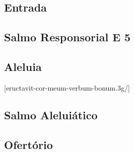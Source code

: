 
\subsection{Entrada}\label{subsection:proprium-sanctorum/in-assumptione-bmv/introitus}

\AllowPageFlush

\subsection[Salmo Responsorial]{Salmo Responsorial \textmd{E 5}}\label{subsection:proprium-sanctorum/in-assumptione-bmv/psalmus-responsorius}

\AllowPageFlush

\subsection{Aleluia}\label{subsection:proprium-sanctorum/in-assumptione-bmv/alleluia}
[eructavit-cor-meum-verbum-bonum.3g/]

\AllowPageFlush

\subsection{Salmo Aleluiático}\label{subsection:proprium-sanctorum/in-assumptione-bmv/psalmus-alleluiaticus}
\begin{annotation}
\end{annotation}

\subsection{Ofertório}\label{subsection:proprium-sanctorum/in-assumptione-bmv/offertorium}

